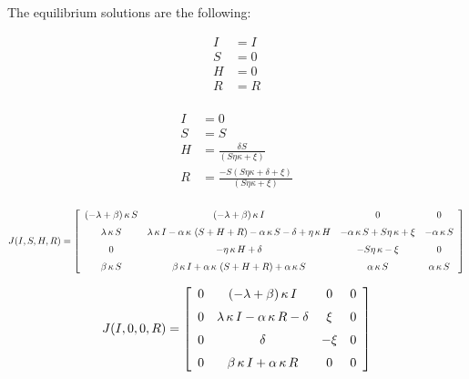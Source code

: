 \documentclass[11pt]{article}
\begin{document}
The equilibrium solutions are the following:

\begin{minipage}{0.48\linewidth}
\begin{align*}
I&= I\\  S&= 0\\ H&= 0 \\  R&= R\\
\end{align*}
\end{minipage}
\begin{minipage}{0.48\linewidth}
\begin{align*}
I &= 0\\ S &= S\\ H &= \frac{\delta S}{(S\eta\kappa+\xi)}\\  R &= \frac{-S(S\eta\kappa+\delta+\xi)}{(S\eta\kappa+\xi)}\\ 
\end{align*}
\end{minipage}




\begin{equation*}
J(I, S , H, R) =
\left[ \begin {array}{cccc}  \left( -\lambda+\beta \right) \kappa\,S&
 \left( -\lambda+\beta \right) \kappa\,I&0&0\\ \noalign{\medskip}
\lambda\,\kappa\,S&\lambda\,\kappa\,I-\alpha\,\kappa\, \left( S+H+R
 \right) -\alpha\,\kappa\,S-\delta+\eta\,\kappa\,H&-\alpha\,\kappa\,S+
S\eta\,\kappa+\xi&-\alpha\,\kappa\,S\\ \noalign{\medskip}0&-\eta\,
\kappa\,H+\delta&-S\eta\,\kappa-\xi&0\\ \noalign{\medskip}\beta\,
\kappa\,S&\beta\,\kappa\,I+\alpha\,\kappa\, \left( S+H+R \right) +
\alpha\,\kappa\,S&\alpha\,\kappa\,S&\alpha\,\kappa\,S\end {array}
 \right]
\end{equation*}
 

 
 \begin{equation*} %
 J(I, 0 , 0, R) =
  \left[ \begin {array}{cccc} 0& \left( -\lambda+\beta \right) \kappa\,
I&0&0\\ \noalign{\medskip}0&\lambda\,\kappa\,I-\alpha\,\kappa\,R-
\delta&\xi&0\\ \noalign{\medskip}0&\delta&-\xi&0\\ \noalign{\medskip}0
&\beta\,\kappa\,I+\alpha\,\kappa\,R&0&0\end {array} \right]
\end{equation*}
 
\end{document}

